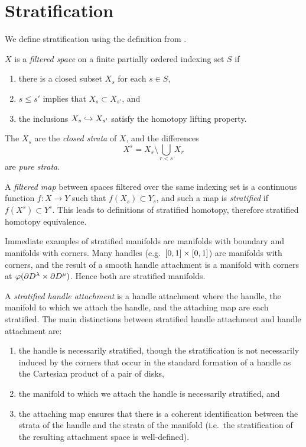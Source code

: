 \section{Stratification}
\label{section:problem-stratification}

We define stratification using the definition from \cite{wein94}.

\begin{defn}[Stratification]
	$X$ is a \emph{filtered space} on a finite partially ordered indexing set $S$ if 
	\begin{enumerate}
		\item there is a closed subset $X_s$ for each $s\in S$,
		\item $s\leq s'$ implies that $X_s\subset X_{s'}$, and
		\item the inclusions $X_s \hookrightarrow X_{s'}$ satisfy the homotopy lifting property.
	\end{enumerate}
	The $X_s$ are the \emph{closed strata} of $X$, and the differences
	$$X^s = X_s\setminus \bigcup_{r < s} X_r$$
	are \emph{pure strata}.
	
	
	A \emph{filtered map} between spaces filtered over the same indexing set is a continuous function $f:X\to Y$ such that $f(X_s)\subset Y_s$, and such a map is \emph{stratified} if $f(X^s) \subset Y^s$.
	This leads to definitions of stratified homotopy, therefore stratified homotopy equivalence.
\end{defn}

Immediate examples of stratified manifolds are manifolds with boundary and manifolds with corners.
Many handles (e.g.\ $[0,1]\times[0,1]$) are manifolds with corners, and the result of a smooth handle attachment is a manifold with corners at $\varphi(\partial D^\lambda \times \partial D^\mu)$.
Hence both are stratified manifolds.

A \emph{stratified handle attachment} is a handle attachment where the handle, the manifold to which we attach the handle, and the attaching map are each stratified.
The main distinctions between stratified handle attachment and handle attachment are:
\begin{enumerate}
	\item the handle is necessarily stratified, though the stratification is not necessarily induced by the corners that occur in the standard formation of a handle as the Cartesian product of a pair of disks,
	
	\item the manifold to which we attach the handle is necessarily stratified, and
	
	\item the attaching map ensures that there is a coherent identification between the strata of the handle and the strata of the manifold (i.e.\ the stratification of the resulting attachment space is well-defined).
\end{enumerate}
